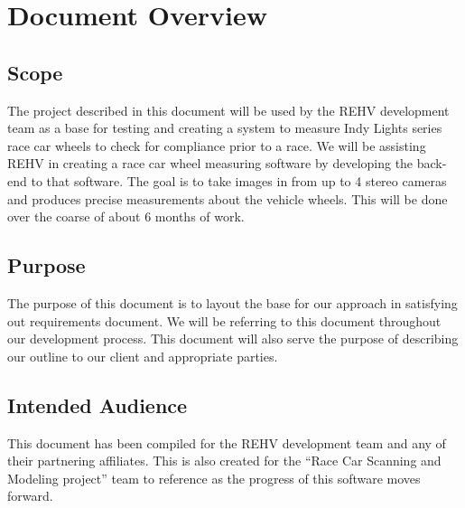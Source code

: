 \documentclass[onecolumn, draftclsnofoot,10pt, compsoc]{IEEEtran}
\begin{document}
\section{Document Overview}
\subsection{Scope}
The project described in this document will be used by the REHV development team as a base for testing and creating a system to measure Indy Lights series race car wheels to check for compliance prior to a race. We will be assisting REHV in creating a race car wheel measuring software by developing the back-end to that software. The goal is to take images in from up to 4 stereo cameras and produces precise measurements about the vehicle wheels. This will be done over the coarse of about 6 months of work. 

\subsection{Purpose}
The purpose of this document is to layout the base for our approach in satisfying out requirements document. We will be referring to this document throughout our development process. This document will also serve the purpose of describing our outline to our client and appropriate parties. 

\subsection{Intended Audience}
This document has been compiled for the REHV development team and any of their partnering affiliates. This is also created for the “Race Car Scanning and Modeling project” team to reference as the progress of this software moves forward.
\end{document}
